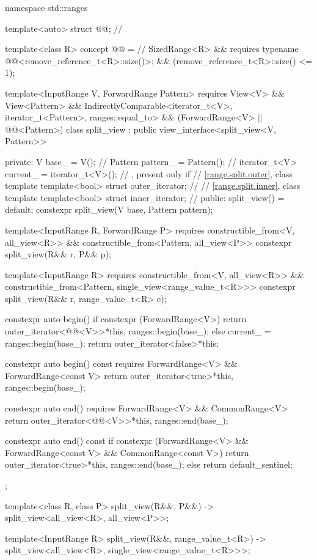 \begin{codeblock}
namespace std::ranges {
  template<auto> struct @@;       // \expos

  template<class R>
  concept @@ =                          // \expos
    SizedRange<R> &&
    requires { typename @@<remove_reference_t<R>::size()>; } &&
    (remove_reference_t<R>::size() <= 1);

  template<InputRange V, ForwardRange Pattern>
    requires View<V> && View<Pattern> &&
             IndirectlyComparable<iterator_t<V>, iterator_t<Pattern>, ranges::equal_to> &&
             (ForwardRange<V> || @@<Pattern>)
  class split_view : public view_interface<split_view<V, Pattern>> {
  private:
    V base_ = V();                              // \expos
    Pattern pattern_ = Pattern();               // \expos
    iterator_t<V> current_ = iterator_t<V>();   // \expos, present only if 
    // \ref{range.split.outer}, class template 
    template<bool> struct outer_iterator;       // \expos
    // \ref{range.split.inner}, class template 
    template<bool> struct inner_iterator;       // \expos
  public:
    split_view() = default;
    constexpr split_view(V base, Pattern pattern);

    template<InputRange R, ForwardRange P>
      requires constructible_from<V, all_view<R>> &&
               constructible_from<Pattern, all_view<P>>
    constexpr split_view(R&& r, P&& p);

    template<InputRange R>
      requires constructible_from<V, all_view<R>> &&
               constructible_from<Pattern, single_view<range_value_t<R>>>
    constexpr split_view(R&& r, range_value_t<R> e);

    constexpr auto begin() {
      if constexpr (ForwardRange<V>)
        return outer_iterator<@@<V>>{*this, ranges::begin(base_)};
      else {
        current_ = ranges::begin(base_);
        return outer_iterator<false>{*this};
      }
    }

    constexpr auto begin() const requires ForwardRange<V> && ForwardRange<const V> {
      return outer_iterator<true>{*this, ranges::begin(base_)};
    }

    constexpr auto end() requires ForwardRange<V> && CommonRange<V> {
      return outer_iterator<@@<V>>{*this, ranges::end(base_)};
    }

    constexpr auto end() const {
      if constexpr (ForwardRange<V> && ForwardRange<const V> && CommonRange<const V>)
        return outer_iterator<true>{*this, ranges::end(base_)};
      else
        return default_sentinel;
    }
  };

  template<class R, class P>
    split_view(R&&, P&&) -> split_view<all_view<R>, all_view<P>>;

  template<InputRange R>
    split_view(R&&, range_value_t<R>)
      -> split_view<all_view<R>, single_view<range_value_t<R>>>;
}
\end{codeblock}

